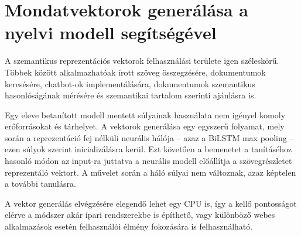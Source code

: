\section{Mondatvektorok generálása a nyelvi modell segítségével}

A szemantikus reprezentációs vektorok felhasználási területe igen széleskörű. Többek között alkalmazhatóak írott szöveg összegzésére, dokumentumok keresésére, chatbot-ok implementálására, dokumentumok szemantikus hasonlóságának mérésére és szemantikai tartalom szerinti ajánlásra is.

Egy eleve betanított modell mentett súlyainak használata nem igényel komoly erőforrásokat és tárhelyet. A vektorok generálása egy egyszerű folyamat, mely során a reprezentáció fej nélküli neurális hálója – azaz a BiLSTM max pooling – ezen súlyok szerint inicializálásra kerül. Ezt követően a bemenetet a tanításéhoz hasonló módon az input-ra juttatva a neurális modell előállítja a szövegrészletet reprezentáló vektort. A művelet során a háló súlyai nem változnak, azaz képtelen a további tanulásra.

A vektor generálás elvégzésére elegendő lehet egy CPU is, így a kellő pontosságot elérve a módszer akár ipari rendszerekbe is építhető, vagy különböző webes alkalmazások esetén felhasználói élmény fokozására is felhasználható.